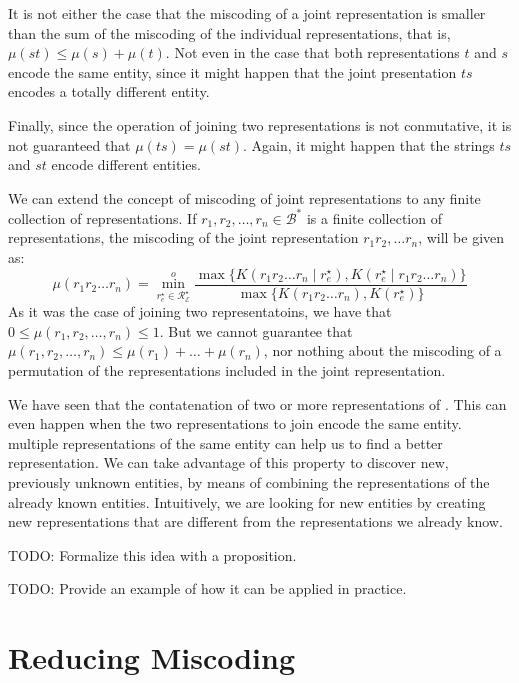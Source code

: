 It is not either the case that the miscoding of a joint representation is smaller than the sum of the miscoding of the individual representations, that is, $\mu( st ) \leq \mu(s) + \mu(t)$. Not even in the case that both representations $t$ and $s$ encode the same entity, since it might happen that the joint presentation $ts$ encodes a totally different entity.

Finally, since the operation of joining two representations is not conmutative, it is not guaranteed that $\mu(ts) = \mu(st)$. Again, it might happen that the strings $ts$ and $st$ encode different entities.

We can extend the concept of miscoding of joint representations to any finite collection of representations. If $r_1, r_2, \ldots, r_n \in \mathcal{B}^\ast$ is a finite collection of representations, the miscoding of the joint representation $r_1 r_2, \ldots r_n$, will be given as:
\[
\mu(r_1 r_2 \ldots r_n) = \overset{o}{ \underset{ r^\star_e \in \mathcal{R}^\star_\mathcal{E} } \min} \frac{ \max\{ K \left( r_1 r_2 \ldots r_n \mid r^\star_e \right), K \left( r^\star_e \mid r_1 r_2 \ldots r_n \right) \} } { \max\{ K \left( r_1 r_2 \ldots r_n \right), K \left( r^\star_e \right) \} }
\]
As it was the case of joining two representatoins, we have that $0 \leq \mu(r_1, r_2, \ldots, r_n) \leq 1$. But we cannot guarantee that  $\mu(r_1, r_2, \ldots, r_n) \leq \mu(r_1) + \ldots + \mu(r_n)$, nor nothing about the miscoding of a permutation of the representations included in the joint representation.

We have seen that the contatenation of two or more representations of . This can even happen when the two representations to join encode the same entity.
multiple representations of the same entity can help us to find a better representation. We can take advantage of this property to discover new, previously unknown entities, by means of combining the representations of the already known entities. Intuitively, we are looking for new entities by creating new representations that are different from the representations we already know.

{\color{red} TODO: Formalize this idea with a proposition.}

{\color{red} TODO: Provide an example of how it can be applied in practice.}

%
%

\section{Reducing Miscoding}

